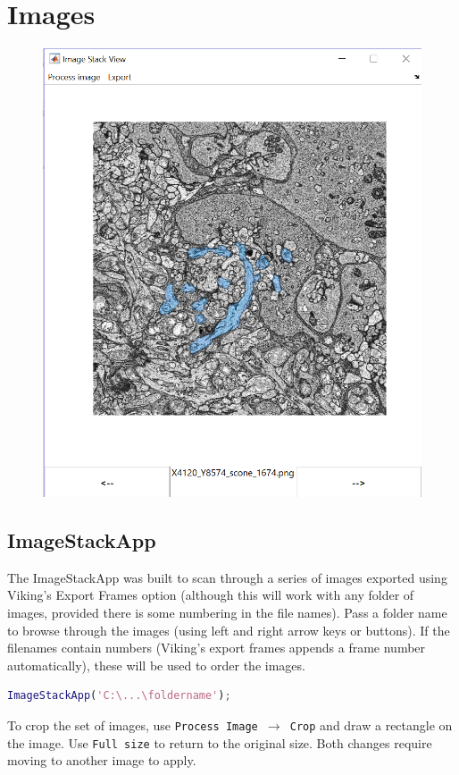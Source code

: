 \documentclass[12pt]{exam}
\begin{document}
	\section{Images}
	\begin{figure}
		\includegraphics[width=\linewidth]{imstackapp}
	\end{figure}
	\subsection{ImageStackApp}
	The ImageStackApp was built to scan through a series of images exported using Viking's Export Frames option (although this will work with any folder of images, provided there is some numbering in the file names). Pass a folder name to browse through the images (using left and right arrow keys or buttons). If the filenames contain numbers (Viking's export frames appends a frame number automatically), these will be used to order the images.
	\begin{lstlisting}[language=matlab]
	ImageStackApp('C:\...\foldername');\end{lstlisting}
	To crop the set of images, use \texttt{Process Image $\rightarrow$ Crop} and draw a rectangle on the image. Use \texttt{Full size} to return to the original size. Both changes require moving to another image to apply.
	
\end{document}
